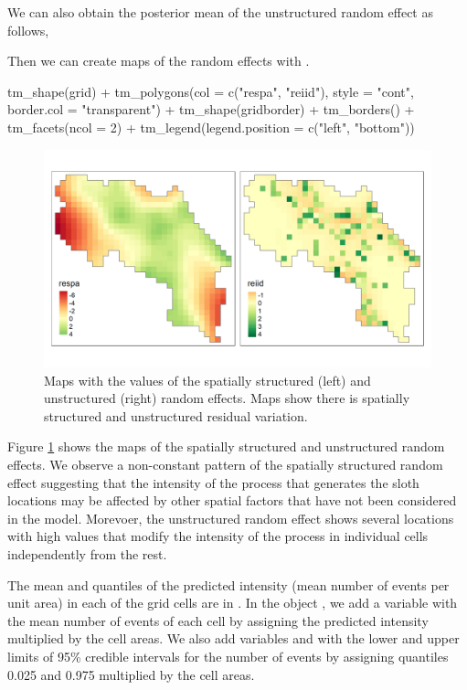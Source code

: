 We can also obtain the posterior mean of the unstructured random effect as follows,

Then we can create maps of the random effects with .

\begin{example}
tm_shape(grid) +
  tm_polygons(col = c("respa", "reiid"), style = "cont", border.col = "transparent")  +
  tm_shape(gridborder) + tm_borders() +
  tm_facets(ncol = 2) + tm_legend(legend.position = c("left", "bottom"))
\end{example}


\begin{figure}[htbp]
  \centering
  \includegraphics[width=.8\textwidth]{tmaprandomeffects}
  \caption{Maps with the values of the spatially structured (left) and unstructured (right) random effects. Maps show there is spatially structured and unstructured residual variation.
}
  \label{fig:tmaprandomeffects}
\end{figure}

Figure \ref{fig:tmaprandomeffects} shows the maps of the spatially structured and unstructured random effects.
We observe a non-constant pattern of the spatially structured random effect suggesting that the intensity of the process that generates the sloth locations may be affected by other spatial factors that have not been considered in the model.
Morevoer, the unstructured random effect shows several locations with high values that modify the intensity of the process in individual cells independently from the rest.

The mean and quantiles of the predicted intensity (mean number of events per unit area) in each of the grid cells are in . In the object , we add a variable  with the mean number of events of each cell by assigning the predicted intensity multiplied by the cell areas. We also add variables  and  with the lower and upper limits of 95\% credible intervals for the number of events by assigning quantiles 0.025 and 0.975 multiplied by the cell areas.

